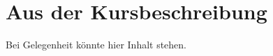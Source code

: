 \section{Aus der Kursbeschreibung}

Bei Gelegenheit könnte hier Inhalt stehen.\cite[s. Literaturverzeichnis]{quelle1}

